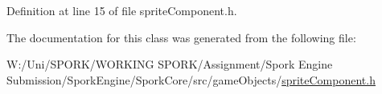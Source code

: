 Definition at line 15 of file sprite\+Component.\+h.



The documentation for this class was generated from the following file\+:\begin{DoxyCompactItemize}
\item 
W\+:/\+Uni/\+S\+P\+O\+R\+K/\+W\+O\+R\+K\+I\+N\+G S\+P\+O\+R\+K/\+Assignment/\+Spork Engine Submission/\+Spork\+Engine/\+Spork\+Core/src/game\+Objects/\hyperlink{sprite_component_8h}{sprite\+Component.\+h}\end{DoxyCompactItemize}
